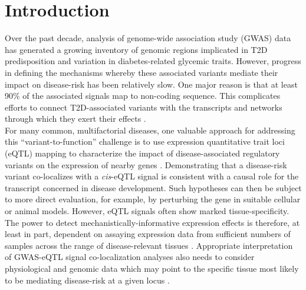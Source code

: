\section{Introduction}
Over the past decade, analysis of genome-wide association study (GWAS) data has generated a growing inventory of genomic regions implicated in T2D predisposition and variation in diabetes-related glycemic traits. However, progress in defining the mechanisms whereby these associated variants mediate their impact on disease-risk has been relatively slow. One major reason is that at least 90\% of the associated signals map to non-coding sequence. This complicates efforts to connect T2D-associated variants with the transcripts and networks through which they exert their effects \cite{thediabetesgeneticsreplicationandmeta-analysisdiagramconsortiumLargescaleAssociationAnalysis2012,diabetesgeneticsreplicationandmeta-analysisdiagramconsortiumGenomewideTransancestryMetaanalysis2014,fuchsbergerGeneticArchitectureType2016a,scottExpandedGenomeWideAssociation2017,mahajanFinemappingTypeDiabetes2018}. \\
    
For many common, multifactorial diseases, one valuable approach for addressing this “variant-to-function” challenge is to use expression quantitative trait loci (eQTL) mapping to characterize the impact of disease-associated regulatory variants on the expression of nearby genes \cite{gamazonUsingAtlasGene2018}. Demonstrating that a disease-risk variant co-localizes with a \textit{cis}-eQTL signal is consistent with a causal role for the transcript concerned in disease development. Such hypotheses can then be subject to more direct evaluation, for example, by perturbing the gene in suitable cellular or animal models. However, eQTL signals often show marked tissue-specificity. The power to detect mechanistically-informative expression effects is therefore, at least in part, dependent on assaying expression data from sufficient numbers of samples across the range of disease-relevant tissues \cite{gamazonUsingAtlasGene2018}. Appropriate interpretation of GWAS-eQTL signal co-localization analyses also needs to consider physiological and genomic data which may point to the specific tissue most likely to be mediating disease-risk at a given locus \cite{mahajanFinemappingTypeDiabetes2018, mahajanRefiningAccuracyValidated2018}. \\
    
